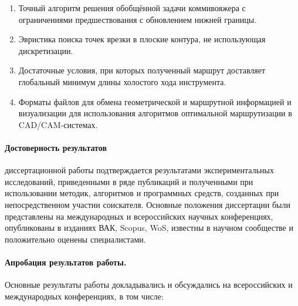 \begin{enumerate}
  \item
    Точный алгоритм решения обобщённой задачи коммивояжера
    с ограничениями предшествования
    с обновлением нижней границы.
  \item
    Эвристика поиска точек врезки в плоские контура,
    не использующая дискретизации.
  \item
    Достаточные условия, при которых полученный маршрут
    доставляет глобальный минимум длины холостого хода инструмента.
  \item
    Форматы файлов для обмена геометрической и маршрутной информацией
    и визуализации для использования алгоритмов оптимальной маршрутизации
    в CAD/CAM-системах.
\end{enumerate}

\paragraph*{Достоверность результатов}
диссертационной работы подтверждается результатами экспериментальных исследований,
приведенными в ряде публикаций и полученными при использовании методик, алгоритмов и программных средств,
созданных при непосредственном участии соискателя.
Основные положения диссертации были представлены на международных и всероссийских научных конференциях,
опубликованы в изданиях ВАК, Scopus, WoS,
известны в научном сообществе и положительно оценены специалистами.

\paragraph*{Апробация результатов работы.}
Основные результаты работы докладывались и обсуждались на всероссийских и международных конференциях, в том числе:

